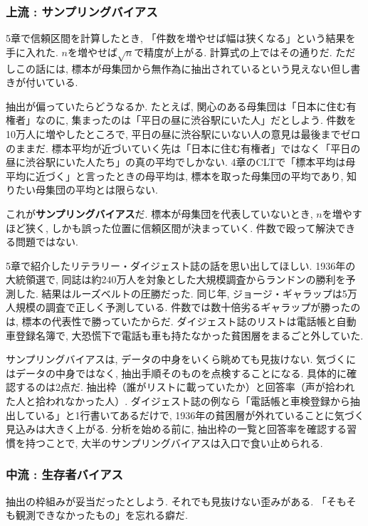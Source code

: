 \subsubsection*{上流 : サンプリングバイアス}

5章で信頼区間を計算したとき, 「件数を増やせば幅は狭くなる」という結果を手に入れた.
$n$を増やせば$\sqrt{n}$で精度が上がる. 計算式の上ではその通りだ.
ただしこの話には, 標本が母集団から無作為に抽出されているという見えない但し書きが付いている.

抽出が偏っていたらどうなるか.
たとえば, 関心のある母集団は「日本に住む有権者」なのに, 集まったのは「平日の昼に渋谷駅にいた人」だとしよう.
件数を10万人に増やしたところで, 平日の昼に渋谷駅にいない人の意見は最後までゼロのままだ.
標本平均が近づいていく先は「日本に住む有権者」ではなく「平日の昼に渋谷駅にいた人たち」の真の平均でしかない.
4章のCLTで「標本平均は母平均に近づく」と言ったときの母平均は, 標本を取った母集団の平均であり, 知りたい母集団の平均とは限らない.

これが\textbf{サンプリングバイアス}だ.
標本が母集団を代表していないとき, $n$を増やすほど狭く, しかも誤った位置に信頼区間が決まっていく.
件数で殴って解決できる問題ではない.

5章で紹介したリテラリー・ダイジェスト誌の話を思い出してほしい.
1936年の大統領選で, 同誌は約240万人を対象とした大規模調査からランドンの勝利を予測した.
結果はルーズベルトの圧勝だった. 同じ年, ジョージ・ギャラップは5万人規模の調査で正しく予測している.
件数では数十倍劣るギャラップが勝ったのは, 標本の代表性で勝っていたからだ.
ダイジェスト誌のリストは電話帳と自動車登録名簿で, 大恐慌下で電話も車も持たなかった貧困層をまるごと外していた.

サンプリングバイアスは, データの中身をいくら眺めても見抜けない.
気づくにはデータの中身ではなく, 抽出手順そのものを点検することになる.
具体的に確認するのは2点だ. 抽出枠（誰がリストに載っていたか）と回答率（声が拾われた人と拾われなかった人）.
ダイジェスト誌の例なら「電話帳と車検登録から抽出している」と1行書いてあるだけで, 1936年の貧困層が外れていることに気づく見込みは大きく上がる.
分析を始める前に, 抽出枠の一覧と回答率を確認する習慣を持つことで, 大半のサンプリングバイアスは入口で食い止められる.

\subsubsection*{中流 : 生存者バイアス}

抽出の枠組みが妥当だったとしよう. それでも見抜けない歪みがある.
「そもそも観測できなかったもの」を忘れる癖だ.

